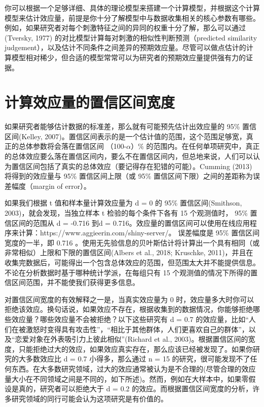 \documentclass[
  letterpaper,
  DIV=11,
  numbers=noendperiod]{scrreprt}
\begin{document}
你可以根据一个足够详细、具体的理论模型来搭建一个计算模型，并根据这个计算模型来估计效应量，前提是你十分了解模型中与数据收集相关的核心参数有哪些。例如，如果研究者对每个刺激特征之间的异同的权重十分了解，那么可以通过(Tversky,
1977) 的对比模型计算每对刺激的相似性判断预测（predicted similarity
judgement），以及估计不同条件之间差异的预期效应量。尽管可以做点估计的计算模型相对稀少，但合适的模型常常可以为研究者的预期效应量提供强有力的证据。

\hypertarget{ux8ba1ux7b97ux6548ux5e94ux91cfux7684ux7f6eux4fe1ux533aux95f4ux5bbdux5ea6}{%
\section{计算效应量的置信区间宽度}\label{ux8ba1ux7b97ux6548ux5e94ux91cfux7684ux7f6eux4fe1ux533aux95f4ux5bbdux5ea6}}

如果研究者能够估计数据的标准差，那么就有可能预先估计出效应量的 95\%
置信区间(Kelley,
2007)。置信区间表示的是一个估计值的范围，这个范围足够宽，真正的总体参数将会落在置信区间
（100-\(\alpha\)）\%
的范围内。在任何单项研究中，真正的总体效应要么落在置信区间内，要么不在置信区间内，但总地来说，人们可以认为置信区间包括了真实的总体效应（要记得存在犯错的可能）。Cumming
(2013) 将得到的效应量与 95\% 置信区间上限（或 95\%
置信区间下限）之间的差距称为误差幅度（margin of error）。

如果我们根据 t 值和样本量计算效应量为 d = 0 的 95\% 置信区间(Smithson,
2003)，就会发现，当独立样本 t 检验的每个条件下各有 15 个观测值时， 95\%
置信区间的范围从 d = -0.716 到d =
0.716。效应量的置信区间可以使用在线应用程序来计算：https://www.aggieerin.com/shiny-server/。
误差幅度是 95\% 置信区间宽度的一半，即 0.716
。使用无先验信息的贝叶斯估计将计算出一个具有相同（或非常相似）上限和下限的置信区间(Albers
et al., 2018; Kruschke,
2011)，并且在收集完数据后，可能得出一个包含总体效应的范围，但范围太大并不能提供信息。不论在分析数据时基于哪种统计学派，在每组只有
15 个观测值的情况下所得的置信区间范围，并不能使我们获得更多信息。

对置信区间宽度的有效解释之一是，当真实效应量为 0
时，效应量多大时你可以拒绝该效应。换句话说，如果效应不存在，根据收集到的数据情况，你能够拒绝哪些效应量？哪些效应量不会被拒绝？以下这些研究有
d = 0.7
的效应量，比如``人们在被激怒时变得具有攻击性''，``相比于其他群体，人们更喜欢自己的群体''，以及``恋爱对象在外表吸引力上彼此相似''(Richard
et al.,
2003)。根据置信区间的宽度，只能拒绝过大的效应，如果效应真实存在，那么应该已经被发现了。如果你研究的大多数效应比
d = 0.7 小得多，那么通过 n = 15
的研究，很可能发现不了任何东西。在大多数研究领域，过大的效应通常被认为是不合理的(尽管合理的效应量大小在不同领域之间是不同的，如下所述)。然而，例如在大样本中，如果零假设是真的，研究者可以拒绝大于
d = 0.2
的效应。而根据置信区间宽度的分析，许多研究领域的同行可能会认为这项研究是有价值的。
\end{document}
